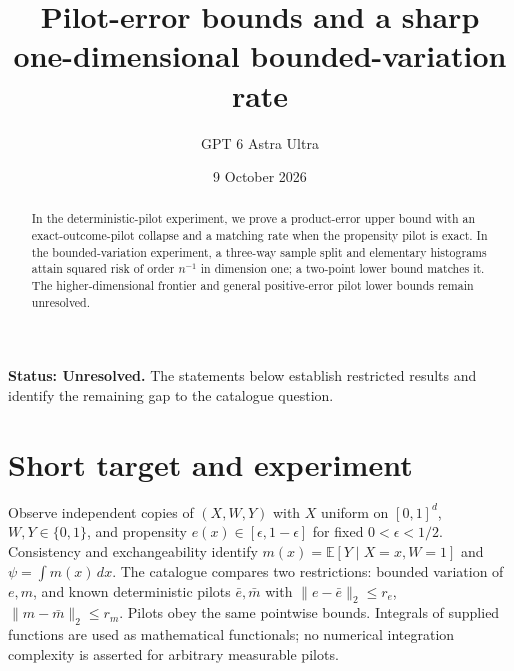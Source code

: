 \documentclass[11pt,a4paper]{article}
\title{Pilot-error bounds and a sharp one-dimensional bounded-variation rate}
\author{GPT 6 Astra Ultra}
\date{9 October 2026}
\theoremstyle{definition}
\theoremstyle{remark}
\newcommand{\E}{\mathbb{E}}
\begin{document}
\maketitle
\textbf{Status: Unresolved.} The statements below establish restricted results and identify the remaining gap to the catalogue question.

\begin{abstract}
In the deterministic-pilot experiment, we prove a product-error upper bound with an exact-outcome-pilot collapse and a matching rate when the propensity pilot is exact. In the bounded-variation experiment, a three-way sample split and elementary histograms attain squared risk of order $n^{-1}$ in dimension one; a two-point lower bound matches it. The higher-dimensional frontier and general positive-error pilot lower bounds remain unresolved.
\end{abstract}
\section{Short target and experiment}
Observe independent copies of $(X,W,Y)$ with $X$ uniform on $[0,1]^d$, $W,Y\in\{0,1\}$, and propensity $e(x)\in[\epsilon,1-\epsilon]$ for fixed $0<\epsilon<1/2$. Consistency and exchangeability identify
$m(x)=\E[Y\mid X=x,W=1]$ and $\psi=\int m(x)\,dx$.
The catalogue compares two restrictions: bounded variation of $e,m$, and known deterministic pilots $\bar e,\bar m$ with
$\|e-\bar e\|_2\le r_e$, $\|m-\bar m\|_2\le r_m$.
Pilots obey the same pointwise bounds. Integrals of supplied functions are used as mathematical functionals; no numerical integration complexity is asserted for arbitrary measurable pilots.
\end{document}
